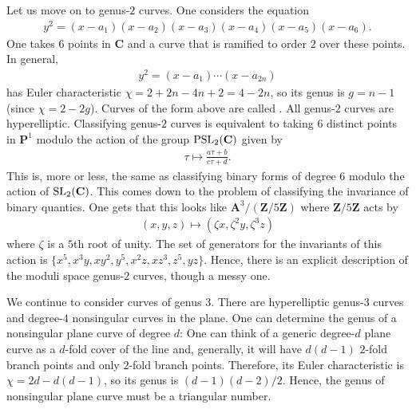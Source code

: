 \documentclass [11 pt, oneside, margin = 1 in] {article}
\begin{document}
Let us move on to genus-$2$ curves. One considers the equation
\begin{align*}
	y^2 = (x-a_1)(x-a_2)(x-a_3)(x-a_4) (x-a_5) (x-a_6).
\end{align*}
One takes $6$ points in $\mathbf{C}$ and a curve that is ramified to order $2$ over these points. In general,
\begin{align*}
	y^2 = (x-a_1)\cdots (x-a_{2n})
\end{align*}
has Euler characteristic $\chi = 2+2n-4n +2 = 4-2n$, so its genus is $g=n-1$ (since $\chi = 2-2g$). Curves of the form above are called . All genus-$2$ curves are hyperelliptic. Classifying genus-$2$ curves is equivalent to taking $6$ distinct points in $\mathbf{P}^1$ modulo the action of the group $\operatorname{PSL}_{2}(\mathbf{C})$ given by
\begin{align*}
	\tau \longmapsto \frac{a\tau+b}{c\tau+d}.
\end{align*}
This is, more or less, the same as classifying binary forms of degree $6$ modulo the action of $\operatorname{SL}_{2}(\mathbf{C})$. This comes down to the problem of classifying the invariance of binary quantics. One gets that this looks like $\mathbf{A}^3/(\mathbf{Z}/5\mathbf{Z})$ where $\mathbf{Z}/5\mathbf{Z}$ acts by
\begin{align*}
	(x,y,z) \longmapsto  (\zeta x,\zeta^2 y, \zeta^3 z)
\end{align*}
where $\zeta$ is a $5$th root of unity. The set of generators for the invariants of this action is $\{x^5,x^3y,xy^2,y^5,x^2z, xz^3, z^5, yz\}$. Hence, there is an explicit description of the moduli space genus-$2$ curves, though a messy one. 

We continue to consider curves of genus $3$. There are hyperelliptic genus-$3$ curves and degree-$4$ nonsingular curves in the plane. One can determine the genus of a nonsingular plane curve of degree $d$: One can think of a generic degree-$d$ plane curve as a $d$-fold cover of the line and, generally, it will have $d(d-1)$ $2$-fold branch points and only $2$-fold branch points. Therefore, its Euler characteristic is $\chi = 2d -  d(d-1)$, so its genus is $(d-1) (d-2)/2$. Hence, the genus of nonsingular plane curve must be a triangular number.
\end{document}

